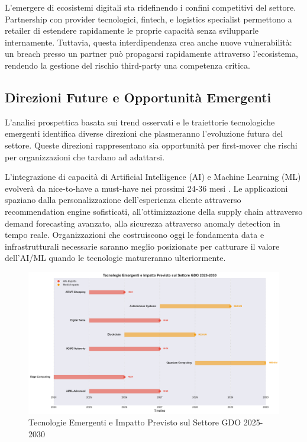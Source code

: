 L'emergere di ecosistemi digitali sta ridefinendo i confini competitivi del settore. Partnership con provider tecnologici, fintech, e logistics specialist permettono a retailer di estendere rapidamente le proprie capacità senza svilupparle internamente. Tuttavia, questa interdipendenza crea anche nuove vulnerabilità: un breach presso un partner può propagarsi rapidamente attraverso l'ecosistema, rendendo la gestione del rischio third-party una competenza critica.

\subsection{Direzioni Future e Opportunità Emergenti}

L'analisi prospettica basata sui trend osservati e le traiettorie tecnologiche emergenti identifica diverse direzioni che plasmeranno l'evoluzione futura del settore. Queste direzioni rappresentano sia opportunità per first-mover che rischi per organizzazioni che tardano ad adattarsi.

L'integrazione di capacità di Artificial Intelligence (AI) e Machine Learning (ML) evolverà da nice-to-have a must-have nei prossimi 24-36 mesi \autocite{williams2024aiml}. Le applicazioni spaziano dalla personalizzazione dell'esperienza cliente attraverso recommendation engine sofisticati, all'ottimizzazione della supply chain attraverso demand forecasting avanzato, alla sicurezza attraverso anomaly detection in tempo reale. Organizzazioni che costruiscono oggi le fondamenta data e infrastrutturali necessarie saranno meglio posizionate per catturare il valore dell'AI/ML quando le tecnologie matureranno ulteriormente.

\begin{figure}[htbp]
\centering
\includegraphics[width=1\textwidth]{thesis_figures/cap5/fig_5_4_tech_timeline.pdf}
\caption{Tecnologie Emergenti e Impatto Previsto sul Settore GDO 2025-2030}
\label{fig:tecnologie_future}
\end{figure}

